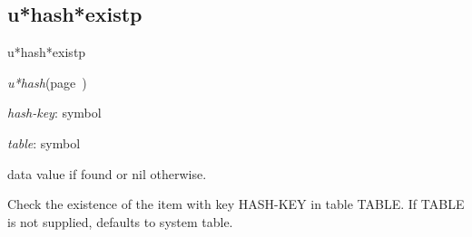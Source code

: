 \subsection{u*hash*existp}
\label{u*hash*existp}

\begin{description}
\item [Name:]  u*hash*existp

\item [Class:]
{\sl u*hash}\hfill(page~\pageref{u*hash})

\item [Parameters:]
\item {\sl hash-key}:  symbol

\item {\sl table}:  symbol


\item [Return-value:] 
data value if found or nil otherwise.

\item [Description:]
Check the existence of the item with key HASH-KEY in
table TABLE. If TABLE is not supplied, defaults
to system table.

\item [Public:]




\end{description}
\horizontalline
